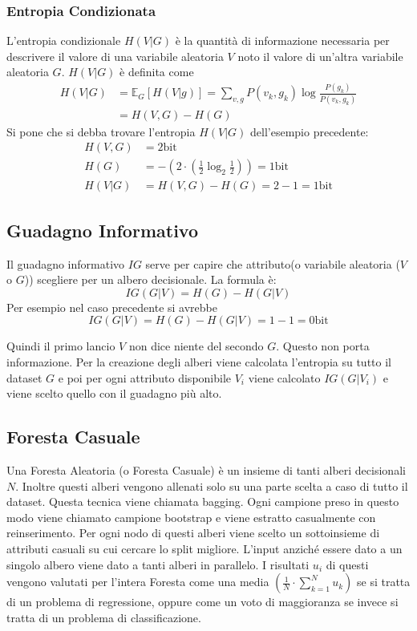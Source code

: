 \subsubsection{Entropia Condizionata}
L'entropia condizionale $H(V|G)$ è la quantità di informazione necessaria per descrivere il valore di una variabile aleatoria 
$V$ noto il valore di un'altra variabile aleatoria $G$.
$H(V|G)$ è definita come
\begin{align}
    H(V|G)&=\mathbb{E}_G[H(V|g)]=\sum_{v,g}P(v_k,g_k)\log\frac{P(g_k)}{P(v_k,g_k)}\\
    &=H(V,G)-H(G)
\end{align}
Si pone che si debba trovare l'entropia $H(V|G)$ dell'esempio precedente:
\begin{align}
    H(V,G)&=2\text{bit}\\
    H(G)&=-\left(2\cdot \left( \frac{1}{2}\log_2\frac{1}{2}\right)\right)=1\text{bit}\\
    H(V|G)&=H(V,G)-H(G)=2-1=1\text{bit}
\end{align}
\subsection{Guadagno Informativo}
\label{subsec:guadagno_informativo}
Il guadagno informativo $IG$ serve per capire che attributo(o variabile aleatoria ($V$ o $G$)) scegliere per un albero decisionale. La formula è:
\[
IG(G|V)=H(G)-H(G|V)
\]
Per esempio nel caso precedente si avrebbe
\[
IG(G|V)=H(G)-H(G|V)=1-1=0\text{bit}
\] 

Quindi il primo lancio $V$ non dice niente del secondo $G$. Questo non porta informazione.
Per la creazione degli alberi viene calcolata l'entropia su tutto il dataset $G$ e poi per ogni attributo disponibile $V_i$ viene 
calcolato $IG(G|V_i)$ e viene scelto quello con il guadagno più alto.

\subsection{Foresta Casuale}
\label{subsec:foresta_casuale}
Una Foresta Aleatoria (o Foresta Casuale) è un insieme di tanti alberi decisionali 
$N$. Inoltre questi alberi vengono allenati solo su una parte scelta a caso di tutto il dataset. 
Questa tecnica viene chiamata bagging. Ogni campione preso in questo modo viene chiamato campione bootstrap e viene estratto casualmente con reinserimento.
Per ogni nodo di questi alberi viene scelto un sottoinsieme di attributi casuali su cui cercare lo split migliore.
L'input anziché essere dato a un singolo albero viene dato a tanti alberi in parallelo. 
I risultati $u_i$ di questi vengono valutati per l'intera Foresta come una media $\left( \frac{1}{N}\cdot\sum^N_{k=1} u_k\right)$ se si tratta di un problema di regressione, oppure come un voto di 
maggioranza se invece si tratta di un problema di classificazione.
